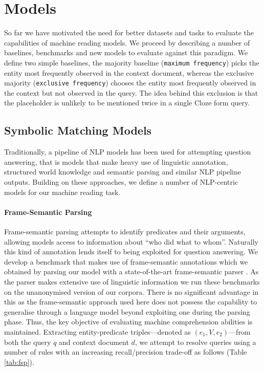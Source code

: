 \documentclass{article}
\begin{document}
 \section{Models}
\label{models}

So far we have motivated the need for better datasets and tasks to evaluate the
capabilities of machine reading models. We proceed by describing a number of
baselines, benchmarks and new models to evaluate against this paradigm.  We
define two simple baselines, the majority baseline ({\tt maximum frequency})
picks the entity most frequently observed in the context document, whereas the
exclusive majority ({\tt exclusive frequency}) chooses the entity most
frequently observed in the context but not observed in the query. The idea
behind this exclusion is that the placeholder is unlikely to be mentioned twice
in a single Cloze form query.

\subsection{Symbolic Matching Models}

Traditionally, a pipeline of NLP models has been used for attempting question
answering, that is models that make heavy use of linguistic annotation,
structured world knowledge and semantic parsing and similar NLP pipeline
outputs.
Building on these approaches, we define a number of NLP-centric models for our
machine reading task.

\paragraph{Frame-Semantic Parsing}

Frame-semantic parsing attempts to identify predicates and their arguments,
allowing models access to information about ``who did what to whom''. Naturally
this kind of annotation lends itself to being exploited for question answering.
We develop a benchmark that makes use of frame-semantic annotations
which we obtained by parsing our model with a state-of-the-art frame-semantic
parser \cite{Das:2013:SRL,Hermann:2014:SRL}. As the parser makes extensive use
of linguistic information we run these benchmarks on the unanonymised version of
our corpora. There is no significant advantage in this as the frame-semantic
approach used here does not possess the capability to generalise through a
language model beyond exploiting one during the parsing phase.
Thus, the key objective of evaluating machine comprehension abilities is
maintained. Extracting entity-predicate triples---denoted as
$(e_1,V,e_2)$---from both the query $q$ and context document $d$, we attempt to
resolve queries using a number of rules with an increasing recall/precision
trade-off as follows (Table \ref{tab:fsp}).
\end{document}
